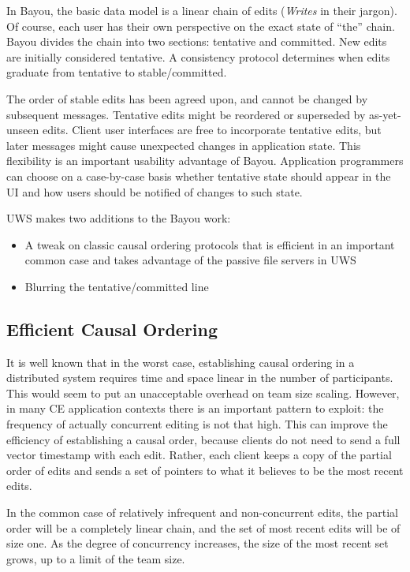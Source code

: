 \documentclass[runningheads]{llncs}
\begin{document}
In Bayou, the basic data model is a linear chain of edits (\emph{Writes} in their jargon).
Of course, each user has their own perspective on the exact state of ``the'' chain.
Bayou divides the chain into two sections: tentative and committed.
New edits are initially considered tentative.
A consistency protocol determines when edits graduate from tentative to stable{\slash}committed.

The order of stable edits has been agreed upon, and cannot be changed by subsequent messages.
Tentative edits might be reordered or superseded by as-yet-unseen edits.
Client user interfaces are free to incorporate tentative edits, but later messages might cause unexpected changes in application state.
This flexibility is an important usability advantage of Bayou.
Application programmers can choose on a case-by-case basis whether tentative state should appear in the UI and how users should be notified of changes to such state.

UWS makes two additions to the Bayou work:

\begin{itemize}
\item A tweak on classic causal ordering protocols that is efficient in an important common case and takes advantage of the passive file servers in UWS
\item Blurring the tentative{\slash}committed line
\end{itemize}

\subsection{Efficient Causal Ordering}

It is well known that in the worst case, establishing causal ordering in a distributed system requires time and space linear in the number of participants.
This would seem to put an unacceptable overhead on team size scaling.
However, in many CE application contexts there is an important pattern to exploit: the frequency of actually concurrent editing is not that high.
This can improve the efficiency of establishing a causal order, because clients do not need to send a full vector timestamp with each edit.
Rather, each client keeps a copy of the partial order of edits and sends a set of pointers to what it believes to be the most recent edits.

In the common case of relatively infrequent and non-concurrent edits, the partial order will be a completely linear chain, and the set of most recent edits will be of size one.
As the degree of concurrency increases, the size of the most recent set grows, up to a limit of the team size.
\end{document}
